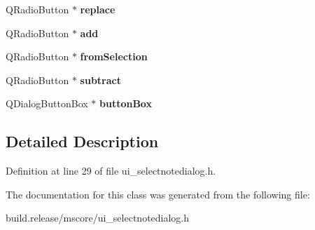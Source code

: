 \begin{DoxyCompactItemize}
Q\+Radio\+Button $\ast$ {\bfseries replace}
\item 
\mbox{\label{class_ui___select_note_dialog_a787a6460d477b269bbf826c219d45572}} 
Q\+Radio\+Button $\ast$ {\bfseries add}
\item 
\mbox{\label{class_ui___select_note_dialog_aec12f7ae2fd4662f335dbc4fcc66a179}} 
Q\+Radio\+Button $\ast$ {\bfseries from\+Selection}
\item 
\mbox{\label{class_ui___select_note_dialog_a8e744ac6975be3cb339cb97fc359323e}} 
Q\+Radio\+Button $\ast$ {\bfseries subtract}
\item 
\mbox{\label{class_ui___select_note_dialog_a428065c71b69cde501937b2b21bdba2b}} 
Q\+Dialog\+Button\+Box $\ast$ {\bfseries button\+Box}
\end{DoxyCompactItemize}


\subsection{Detailed Description}


Definition at line 29 of file ui\+\_\+selectnotedialog.\+h.



The documentation for this class was generated from the following file\+:\begin{DoxyCompactItemize}
\item 
build.\+release/mscore/ui\+\_\+selectnotedialog.\+h\end{DoxyCompactItemize}
